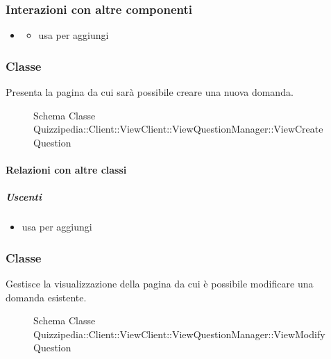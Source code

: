 \subsubsection{Interazioni con altre componenti}
\begin{itemize}
\item {}
\begin{itemize}
\item usa  per aggiungi
\end{itemize}
\end{itemize}
\subsubsection{Classe }
Presenta la pagina da cui sarà possibile creare una nuova domanda.
\begin{figure}[H]
\centering
\noindent{}
\caption[Schema Classe ViewCreateQuestion]{Schema Classe Quizzipedia::Client::ViewClient::ViewQuestionManager::ViewCreateQuestion}
\end{figure}
\paragraph{Relazioni con altre classi}
\subparagraph{Uscenti}
\begin{itemize}
\item usa  per aggiungi
\end{itemize}
\subsubsection{Classe }
Gestisce la visualizzazione della pagina da cui è possibile modificare una domanda esistente.
\begin{figure}[H]
\centering
\noindent{}
\caption[Schema Classe ViewModifyQuestion]{Schema Classe Quizzipedia::Client::ViewClient::ViewQuestionManager::ViewModifyQuestion}
\end{figure}
